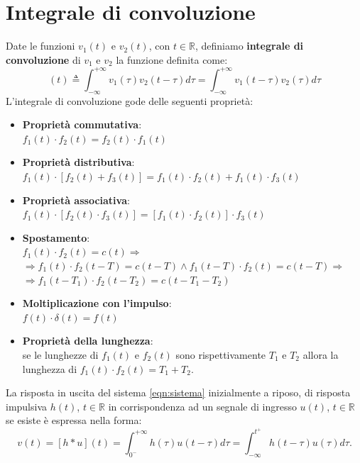 \documentclass[a4paper, titlepage, oneside]{scrbook}
\begin{document}
\section{Integrale di convoluzione}
Date le funzioni $v_1(t)$ e $v_2(t)$, con $t\in \mathbb{R}$, definiamo \textbf{integrale di convoluzione} di $v_1$ e $v_2$ la funzione definita come:
\begin{equation}
[v_1 * v_2](t) \triangleq \int_{-\infty}^{+\infty}v_1(\tau)v_2(t - \tau) d\tau = \int_{-\infty}^{+\infty}v_1(t - \tau)v_2(\tau) d\tau
\label{eqn:integrale_convoluzione}
\end{equation}
L'integrale di convoluzione gode delle seguenti proprietà:
\begin{itemize}
	\item \textbf{Proprietà commutativa}:\\
	$f_1(t)\cdot f_2(t) = f_2(t) \cdot  f_1(t)$
	\item \textbf{Proprietà distributiva}:\\
	$f_1(t)\cdot [f_2(t)+f_3(t)]=f_1(t)\cdot f_2(t)+f_1(t)\cdot f_3(t)$
	\item \textbf{Proprietà associativa}:\\
	$f_1(t)\cdot [f_2(t)\cdot f_3(t)]=[f_1(t)\cdot f_2(t)]\cdot f_3(t)$
	\item \textbf{Spostamento}:\\
	$f_1(t)\cdot f_2(t)=c(t) \Rightarrow$\\
	$\Rightarrow f_1(t)\cdot f_2(t-T)=c(t-T) \wedge f_1(t-T)\cdot f_2(t)=c(t-T) \Rightarrow$\\
	$\Rightarrow f_1(t-T_1)\cdot f_2(t-T_2)=c(t-T_1-T_2)$
	\item \textbf{Moltiplicazione con l'impulso}:\\
	$f(t)\cdot \delta(t)=f(t)$
	\item \textbf{Proprietà della lunghezza}:\\
	se le lunghezze di $f_1(t)$ e $f_2(t)$ sono rispettivamente $T_1$ e $T_2$
	allora la lunghezza di $f_1(t)\cdot f_2(t)=T_1+T_2$.
\end{itemize}
La risposta in uscita del sistema \ref{eqn:sistema} inizialmente a riposo, di risposta impulsiva $h(t)$, $t\in\mathbb{R}$ in corrispondenza ad un segnale di ingresso
$u(t)$, $t\in\mathbb{R}$ se esiste è espressa nella forma:
\begin{equation*}
	v(t)=[h*u](t)=\int_{0^-}^{+\infty}h(\tau)u(t-\tau)d\tau=\int_{-\infty}^{t^+}h(t-\tau)u(\tau)d\tau.
\end{equation*}
\end{document}
